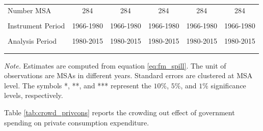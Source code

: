 \documentclass[dv_diss_main.tex]{subfiles}
\begin{document}
\begin{table}[H]
\begin{center}
\begin{tabular}{lccccc}
    Number MSA & 284 & 284 & 284 & 284 & 284 \\
    \vspace{-2pt} & \vspace{-2pt} & \vspace{-2pt} & \vspace{-2pt} & \vspace{-2pt} \\
    Instrument Period & 1966-1980 & 1966-1980 & 1966-1980 & 1966-1980 & 1966-1980 \\
    \vspace{-2pt} & \vspace{-2pt} & \vspace{-2pt} & \vspace{-2pt} & \vspace{-2pt} \\
    Analysis Period & 1980-2015 & 1980-2015 & 1980-2015 & 1980-2015 & 1980-2015 \\ 
    \vspace{-2pt} & \vspace{-2pt} & \vspace{-2pt} & \vspace{-2pt} & \vspace{-2pt} \\ \hline
    
    \vspace{-2pt} & \vspace{-2pt} & \vspace{-2pt} & \vspace{-2pt} \\
    
    \end{tabular}
    \label{tab:earn_spill}
    \end{center}
       
    \footnotesize{\textit{Note. }Estimates are computed from  equation \eqref{eq:fm_spill}. The unit of observations are MSAs in different years. Standard errors are clustered at MSA level. The symbols *, **, and *** represent the $10\%$, $5\%$, and $1\%$ significance levels, respectively.}

\end{table}

\newpage
Table \ref{tab:crowd_privcons} reports the crowding out effect of government spending on private consumption expenditure.
\end{document}
